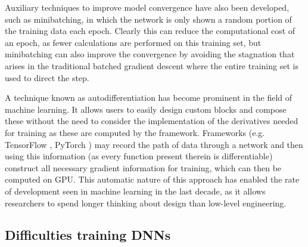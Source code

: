 Auxiliary techniques to improve model convergence have also been developed, such as minibatching, in which the network is only shown a random portion of the training data each epoch.
Clearly this can reduce the computational cost of an epoch, as fewer calculations are performed on this training set, but minibatching can also improve the convergence by avoiding the stagnation that arises in the traditional batched gradient descent where the entire training set is used to direct the step.

A technique known as autodifferentiation has become prominent in the field of machine learning.
It allows users to easily design custom blocks and compose these without the need to consider the implementation of the derivatives needed for training as these are computed by the framework.
Frameworks (e.g. TensorFlow \citep{Abadi2016}, PyTorch \citep{PyTorch}) may record the path of data through a network and then using this information (as every function present therein is differentiable) construct all necessary gradient information for training, which can then be computed on GPU.
This automatic nature of this approach has enabled the rate of development seen in machine learning in the last decade, as it allows researchers to spend longer thinking about design than low-level engineering.

\subsection{Difficulties training DNNs}


